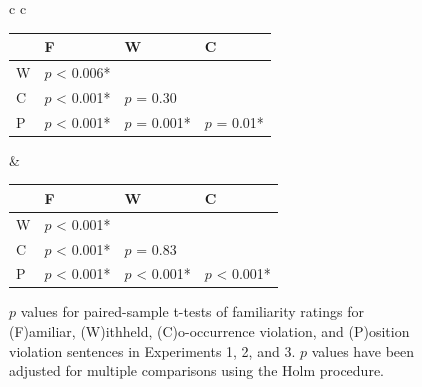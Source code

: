\documentclass[man,floatsintext]{apa6}
\begin{document}
\begin{figure}[h]
\begin{center}
\begin{tabular}{ c c}



      {
        \small
        \begin{tabular}{| l | l |  l | l |}
          \hline
          & F                           & W                         & C \\ 
          \hline
          W &  $p$ < 0.006*  &                           &\\
          \hline
          C &  $p$ < 0.001*  &  $p$ = 0.30  &\\
          \hline
          P &  $p$ < 0.001* &  $p$ = 0.001*  &  $p$ = 0.01*\\
          \hline
        \end{tabular}
      } & 




      {
        \small
        \begin{tabular}{| l | l |  l | l |}
          \hline
          & F                            & W                         & C \\ 
          \hline
          W &  $p$ < 0.001*  &                           &\\
          \hline
          C &  $p$ < 0.001*  &  $p$ = 0.83   &\\
          \hline
          P &  $p$ < 0.001* &  $p$ < 0.001*  &  $p$ < 0.001*\\
          \hline
        \end{tabular}
      } 

    \end{tabular}
    \caption{$p$ values for paired-sample t-tests of familiarity ratings for (F)amiliar, (W)ithheld, (C)o-occurrence violation, and (P)osition violation sentences in Experiments 1, 2, and 3. $p$ values have been adjusted for multiple comparisons using the Holm procedure.}
    \label{familiarity-ordering-t-tests}
  \end{center}
\end{figure}
\end{document}
